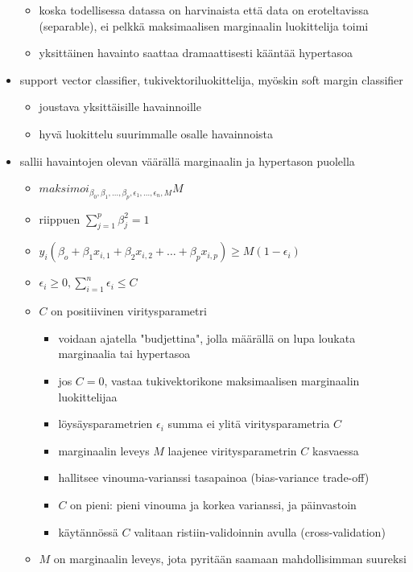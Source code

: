 \begin{itemize}
\begin{itemize}
        \item koska todellisessa datassa on harvinaista että data on eroteltavissa (separable), ei pelkkä maksimaalisen marginaalin luokittelija toimi
        \item yksittäinen havainto saattaa dramaattisesti kääntää hypertasoa
    \end{itemize}
    \item support vector classifier, tukivektoriluokittelija, myöskin soft margin classifier
    \begin{itemize}
        \item joustava yksittäisille havainnoille
        \item hyvä luokittelu suurimmalle osalle havainnoista
    \end{itemize}
    \item sallii havaintojen olevan väärällä marginaalin ja hypertason puolella
    \begin{itemize}
        \item $maksimoi_{\beta_0, \beta_1, \dots, \beta_p, \epsilon_1, \dots, \epsilon_n, M} M$
        \item riippuen $\sum^p_{j=1}\beta^2_j=1$
        \item $y_i(\beta_o + \beta_1 x_{i,1} + \beta_2 x_{i, 2} + \dots + \beta_p x_{i, p}) \geq M(1 - \epsilon_i)$
        \item $\epsilon_i \geq 0, \sum^n_{i=1} \epsilon_i \leq C$
        \item $C$ on positiivinen viritysparametri
        \begin{itemize}
            \item voidaan ajatella "budjettina", jolla määrällä on lupa loukata marginaalia tai hypertasoa
            \item jos $C = 0$, vastaa tukivektorikone maksimaalisen marginaalin luokittelijaa
            \item löysäysparametrien $\epsilon_i$ summa ei ylitä viritysparametria $C$
            \item marginaalin leveys $M$ laajenee viritysparametrin $C$ kasvaessa
            \item hallitsee vinouma-varianssi tasapainoa (bias-variance trade-off)
            \item $C$ on pieni: pieni vinouma ja korkea varianssi, ja päinvastoin
            \item käytännössä $C$ valitaan ristiin-validoinnin avulla (cross-validation)
        \end{itemize}
        \item $M$ on marginaalin leveys, jota pyritään saamaan mahdollisimman suureksi

\end{itemize}
\end{itemize}
